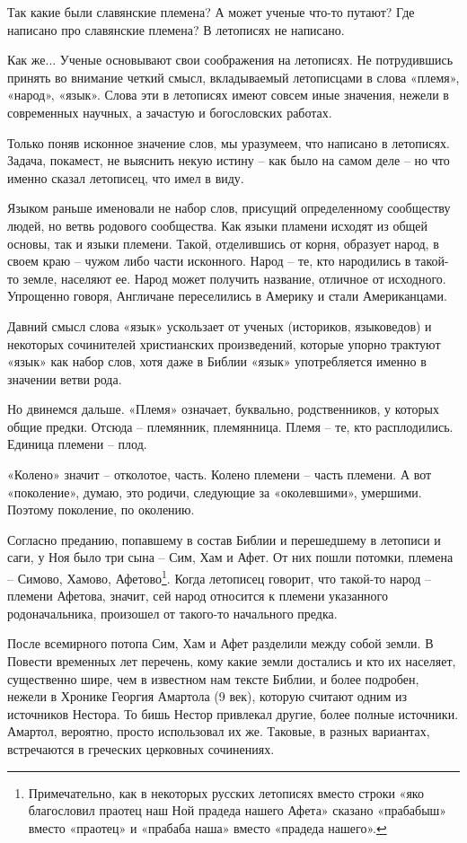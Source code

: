 Так какие были славянские племена? А может ученые что-то путают? Где написано про славянские племена? В летописях не написано.

Как же... Ученые основывают свои соображения на летописях. Не потрудившись принять во внимание четкий смысл, вкладываемый летописцами в слова «племя», «народ», «язык». Слова эти в летописях имеют совсем иные значения, нежели в современных научных, а зачастую и богословских работах.

Только поняв исконное значение слов, мы уразумеем, что написано в летописях. Задача, покамест, не выяснить некую истину – как было на самом деле – но что именно сказал летописец, что имел в виду.

Языком раньше именовали не набор слов, присущий определенному сообществу людей, но ветвь родового сообщества. Как языки пламени исходят из общей основы, так и языки племени. Такой, отделившись от корня, образует народ, в своем краю – чужом либо части исконного. Народ – те, кто народились в такой-то земле, населяют ее. Народ может получить название, отличное от исходного. Упрощенно говоря, Англичане переселились в Америку и стали Американцами.

Давний смысл слова «язык» ускользает от ученых (историков, языковедов) и некоторых сочинителей христианских произведений, которые упорно трактуют «язык» как набор слов, хотя даже в Библии «язык» употребляется именно в значении ветви рода.

Но двинемся дальше. «Племя» означает, буквально, родственников, у которых общие предки. Отсюда – племянник, племянница. Племя – те, кто расплодились. Единица племени – плод.

«Колено» значит – отколотое, часть. Колено племени – часть племени. А вот «поколение», думаю, это родичи, следующие за «околевшими», умершими. Поэтому поколение, по околению.

Согласно преданию, попавшему в состав Библии и перешедшему в летописи и саги, у Ноя было три сына – Сим, Хам и Афет. От них пошли потомки, племена – Симово, Хамово, Афетово\footnote{Примечательно, как в некоторых русских летописях вместо строки «яко благословил праотец наш Ной прадеда нашего Афета» сказано «прабабыш» вместо «праотец» и «прабаба наша» вместо «прадеда нашего».}. Когда летописец говорит, что такой-то народ – племени Афетова, значит, сей народ относится к племени указанного родоначальника, произошел от такого-то начального предка.

После всемирного потопа Сим, Хам и Афет разделили между собой земли. В Повести временных лет перечень, кому какие земли достались и кто их населяет, существенно шире, чем в известном нам тексте Библии, и более подробен, нежели в Хронике Георгия Амартола (9 век), которую считают одним из источников Нестора. То бишь Нестор привлекал другие, более полные источники. Амартол, вероятно, просто использовал их же. Таковые, в разных вариантах, встречаются в греческих церковных сочинениях.

